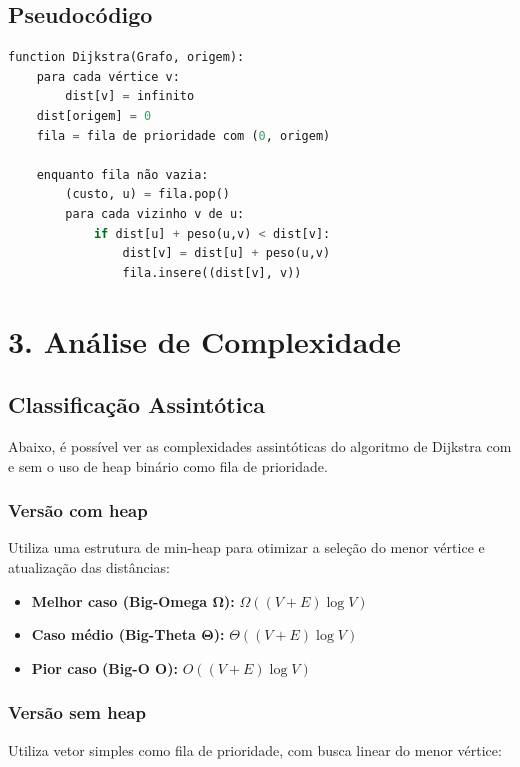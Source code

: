 \documentclass[12pt,a4paper]{report}
\begin{document}
\newpage
\section*{Pseudocódigo}
\begin{lstlisting}[language=Python, caption=Pseudocódigo do algoritmo de Dijkstra]
function Dijkstra(Grafo, origem):
    para cada vértice v:
        dist[v] = infinito
    dist[origem] = 0
    fila = fila de prioridade com (0, origem)

    enquanto fila não vazia:
        (custo, u) = fila.pop()
        para cada vizinho v de u:
            if dist[u] + peso(u,v) < dist[v]:
                dist[v] = dist[u] + peso(u,v)
                fila.insere((dist[v], v))
\end{lstlisting}

\chapter{3. Análise de Complexidade}

\section*{Classificação Assintótica}

Abaixo, é possível ver as complexidades assintóticas do algoritmo de Dijkstra com e sem o uso de heap binário como fila de prioridade.

\subsection*{Versão com heap}
Utiliza uma estrutura de min-heap para otimizar a seleção do menor vértice e atualização das distâncias:

\begin{itemize}
\item \textbf{Melhor caso (Big-Omega $\boldsymbol{\Omega}$):} $\Omega((V + E)\log V)$
\item \textbf{Caso médio (Big-Theta $\boldsymbol{\Theta}$):} $\Theta((V + E)\log V)$
\item \textbf{Pior caso (Big-O $\boldsymbol{O}$):} $O((V + E)\log V)$
\end{itemize}

\subsection*{Versão sem heap}
Utiliza vetor simples como fila de prioridade, com busca linear do menor vértice:
\end{document}

